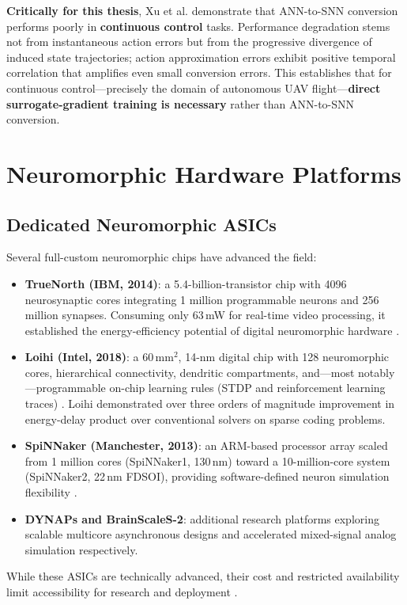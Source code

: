 \documentclass[12pt,a4paper]{article}
\begin{document}
\textbf{Critically for this thesis}, Xu et al. \cite{Xu2026} demonstrate that ANN-to-SNN conversion performs poorly in \textbf{continuous control} tasks. Performance degradation stems not from instantaneous action errors but from the progressive divergence of induced state trajectories; action approximation errors exhibit positive temporal correlation that amplifies even small conversion errors. This establishes that for continuous control---precisely the domain of autonomous UAV flight---\textbf{direct surrogate-gradient training is necessary} rather than ANN-to-SNN conversion.

\section{Neuromorphic Hardware Platforms}
\label{sec:hardware}

\subsection{Dedicated Neuromorphic ASICs}
Several full-custom neuromorphic chips have advanced the field:
\begin{itemize}
    \item \textbf{TrueNorth (IBM, 2014)}: a 5.4-billion-transistor chip with 4096 neurosynaptic cores integrating 1 million programmable neurons and 256 million synapses. Consuming only 63\,mW for real-time video processing, it established the energy-efficiency potential of digital neuromorphic hardware \cite{Merolla2014}.
    \item \textbf{Loihi (Intel, 2018)}: a 60\,mm$^2$, 14-nm digital chip with 128 neuromorphic cores, hierarchical connectivity, dendritic compartments, and---most notably---programmable on-chip learning rules (STDP and reinforcement learning traces) \cite{Davies2018}. Loihi demonstrated over three orders of magnitude improvement in energy-delay product over conventional solvers on sparse coding problems.
    \item \textbf{SpiNNaker (Manchester, 2013)}: an ARM-based processor array scaled from 1 million cores (SpiNNaker1, 130\,nm) toward a 10-million-core system (SpiNNaker2, 22\,nm FDSOI), providing software-defined neuron simulation flexibility \cite{Mayr2019}.
    \item \textbf{DYNAPs and BrainScaleS-2}: additional research platforms exploring scalable multicore asynchronous designs and accelerated mixed-signal analog simulation respectively.
\end{itemize}
While these ASICs are technically advanced, their cost and restricted availability limit accessibility for research and deployment \cite{Isik2023,Schuman2017}.
\end{document}
